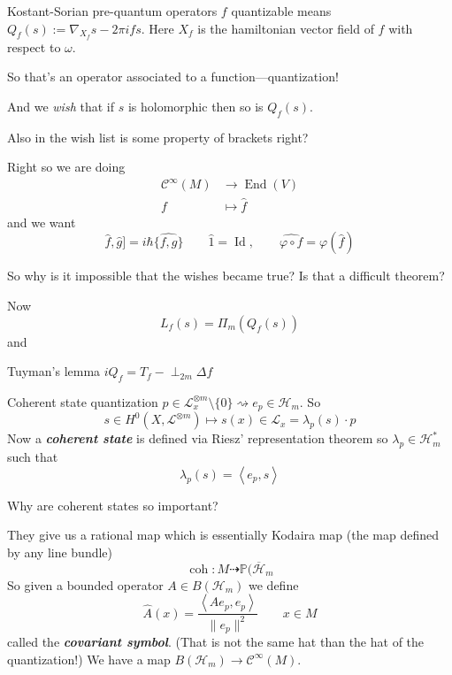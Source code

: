 \begin{thing7}{Kostant-Sorian pre-quantum operators}\leavevmode
	$f$ quantizable means $Q_f(s):=\nabla_{X_f}s-2\pi i fs$. Here $X_f$ is the hamiltonian vector field of  $f$ with respect to  $\omega$. 

	So that's an operator associated to a function---quantization!

	And we \textit{wish} that if  $s$ is holomorphic then so is $Q_f(s)$.
\end{thing7}

\begin{remark}[Sergey]\leavevmode
	Also in the wish list is some property of brackets right?
\end{remark}

Right so we are doing
\begin{align*}
	\mathcal{C}^\infty(M) &\longrightarrow \operatorname{End}(V) \\
	f &\longmapsto \hat{f}
\end{align*}
and we want
\[ \hat{f},\hat{g}]=i\hbar \widehat{\{f,g\}}\qquad \hat{1}=\operatorname{Id},\qquad \widehat{\varphi\circ f}=\varphi(\hat{f})\]

\begin{question}[Dani]\leavevmode
	So why is it impossible that the wishes became true? Is that a difficult theorem?
\end{question}

Now 
\[L_f(s)=\Pi_m(Q_f(s))\]
and
\begin{thing9}{Tuyman's lemma}\leavevmode
	$iQ_f=T_f-\perp_{2m}\Delta f$
\end{thing9}

\begin{thing8}{Coherent state quantization}\leavevmode
	$ p \in \mathcal{L}_x^{\otimes m}\setminus \{0\} \rightsquigarrow e_p \in \mathcal{H}_m$. So
	\[s \in H^{0}(X,\mathcal{L}^{\otimes m})\longmapsto s(x)\in\mathcal{L}_x=\lambda_p(s)\cdot p\]
	Now a \textit{\textbf{coherent state}} is defined via Riesz' representation theorem so  $\lambda_p \in\mathcal{H}_m^*$ such that
	\[\lambda_p(s)=\left<e_p,s\right> \]
\end{thing8}

\begin{question}[Dani]\leavevmode
	Why are coherent states so important?
\end{question}

They give us a rational map which is essentially Kodaira map (the map defined by any line bundle)
\[\operatorname{coh}:M\dashrightarrow \mathbb{P}(\overline{\mathcal{H}}_m\]
So given a bounded operator $A\in B(\mathcal{H}_m)$ we define \[\hat{A}(x)=\frac{\left<Ae_p,e_p\right> }{\|e_p\|^2}\qquad  x\in M\]
called the \textit{\textbf{covariant symbol}}.  {\color{7}(That is not the same hat than the hat of the quantization!)} We have a map $B (\mathcal{H}_m)\to  \mathcal{C}^\infty(M)$.

